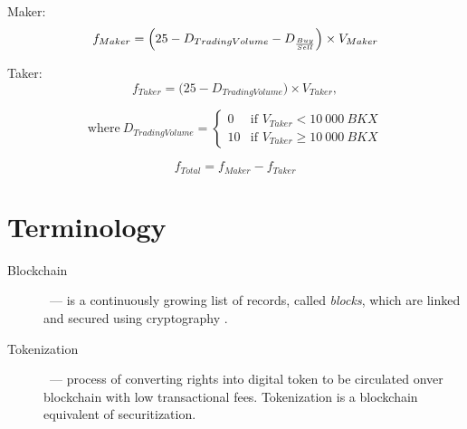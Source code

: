 \documentclass{article}
\begin{document}
\begin{multicols}{2}
Maker:
\begin{equation}
  f_{Maker} = \Big(25-D_{Trading Volume} - D_{Buy \over{Sell}}\Big) \times V_{Maker}
\end{equation}

Taker:
\begin{equation}
    f_{Taker} = \Big(25-D_{Trading Volume}\Big) \times V_{Taker},
\end{equation}

\begin{equation*}
    \text{where}~D_{Trading Volume} =
    \begin{cases} 
        0 & \text{if } V_{Taker} < 10~000~BKX \\
        10 & \text{if } V_{Taker} \geq 10~000~BKX
   \end{cases}
\end{equation*}

\begin{equation}
    f_{Total} = f_{Maker} - f_{Taker}
\end{equation}

\end{multicols}

\newpage
\appendix

\section{Terminology}
\begin{description}
\item[Blockchain]~--- is a continuously growing list of records, called \textit{blocks}, which are linked and secured using cryptography \cite{bitcoinComprehensive2016} \cite{wikipediaBlockchain}.
\item[Tokenization]~--- process of converting rights into digital token to be circulated onver blockchain with low transactional fees. Tokenization is a blockchain equivalent of securitization.
\end{description}

\printbibliography
\end{document}
